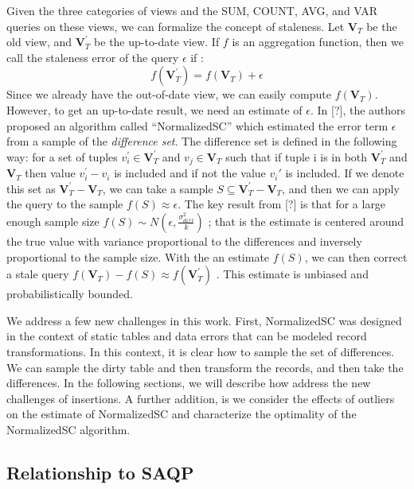 Given the three categories of views and the SUM, COUNT, AVG, and VAR
queries on these views, we can formalize the concept of staleness.
Let $\textbf{V}_{T}$ be the old view, and $\textbf{V}_{T}^{'}$ be
the up-to-date view. If $f$ is an aggregation function, then we call
the staleness error of the query $\epsilon$ if :
\[
f(\textbf{V}_{T}^{'})=f(\textbf{V}_{T})+\epsilon
\]
Since we already have the out-of-date view, we can easily compute
$f(\textbf{V}_{T})$. However, to get an up-to-date result, we need
an estimate of $\epsilon$. In {[}?{]}, the authors proposed an algorithm
called ``NormalizedSC'' which estimated the error term $\epsilon$
from a sample of the \emph{difference set}. The difference set is
defined in the following way: for a set of tuples $v_{i}^{'}\in\textbf{V}_{T}^{'}$
and $v_{j}\in\textbf{V}_{T}$ such that if tuple i is in both $\textbf{V}_{T}^{'}$
and $\textbf{V}_{T}$ then value $v_{i}^{'}-v_{i}$ is included and
if not the value $v_{i}'$ is included. If we denote this set as $\textbf{V}_{T}^{'}-\textbf{V}_{T}$$ $,
we can take a sample $S\subseteq\textbf{V}_{T}^{'}-\textbf{V}_{T}$,
and then we can apply the query to the sample $f(S)\approx\epsilon$.
The key result from {[}?{]} is that for a large enough sample size
$f(S)\sim N(\epsilon,\frac{\sigma_{diff}^{2}}{k})$ ; that is the
estimate is centered around the true value with variance proportional
to the differences and inversely proportional to the sample size.
With the an estimate $f(S)$, we can then correct a stale query $f(\textbf{V}_{T})-f(S)\approx f(\textbf{V}_{T}^{'})$
. This estimate is unbiased and probabilistically bounded.

We address a few new challenges in this work. First, NormalizedSC
was designed in the context of static tables and data errors that
can be modeled record transformations. In this context, it is clear
how to sample the set of differences. We can sample the dirty table
and then transform the records, and then take the differences. In
the following sections, we will describe how address the new challenges
of insertions. A further addition, is we consider the effects of outliers
on the estimate of NormalizedSC and characterize the optimality of
the NormalizedSC algorithm.


\subsection{Relationship to SAQP}

